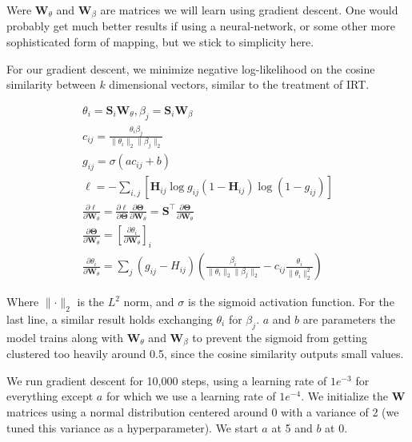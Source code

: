 \documentclass[twocolumn]{article}
\begin{document}
Were $\mathbf{W}_\theta$ and $\mathbf{W}_\beta$ are matrices we will learn
using gradient descent. One would probably get much better results if using a
neural-network, or some other more sophisticated form of mapping, but we stick
to simplicity here.

For our gradient descent, we minimize negative log-likelihood on the cosine
similarity between $k$ dimensional vectors, similar to the treatment of IRT.

\begin{gather}
    \theta_i = \mathbf{S}_i \mathbf{W}_\theta,
    \beta_j = \mathbf{S}_i \mathbf{W}_\beta \\
    c_{ij} = \frac{\theta_i \beta_j}
        {\lVert\theta_i\rVert_2 \lVert\beta_j\rVert_2} \\
    g_{ij} = \sigma(ac_{ij} + b) \\
    \ell = - \sum_{i,j} \left[\mathbf{H}_{ij} \log g_{ij}
        (1 - \mathbf{H}_{ij}) \log (1 - g_{ij})\right] \\
    \frac{\partial\ell}{\partial\mathbf{W}_\theta} = 
        \frac{\partial\ell}{\partial\mathbf{\Theta}}
        \frac{\partial\mathbf{\Theta}}{\partial\mathbf{W}_\theta} =
        \mathbf{S}^\top
        \frac{\partial\mathbf{\Theta}}{\partial\mathbf{W}_\theta} \\
    \frac{\partial\mathbf{\Theta}}{\partial\mathbf{W}_\theta} =
        \left[\frac{\partial\theta_i}{\partial\mathbf{W}_\theta}\right]_i \\
    \frac{\partial\theta_i}{\partial\mathbf{W}_\theta} =
    \sum_j \left(g_{ij} - H_{ij}\right)
        \left(\frac{\beta_i}{\lVert\theta_i\rVert_2 \lVert\beta_j\rVert_2}
         - c_{ij}\frac{\theta_i}{\lVert{\theta_i}\rVert_2^2}\right)
\end{gather}


Where $\lVert\cdot\rVert_2$ is the $L^2$ norm, and $\sigma$ is the sigmoid
activation function. For the last line, a similar result holds exchanging
$\theta_i$ for $\beta_j$. $a$ and $b$ are parameters the model trains along
with $\mathbf{W}_\theta$ and $\mathbf{W}_\beta$ to prevent the sigmoid from
getting clustered too heavily around 0.5, since the cosine similarity outputs
small values.

We run gradient descent for 10,000 steps, using a learning rate of $1e^{-3}$
for everything except $a$ for which we use a learning rate of $1e^{-4}$. We
initialize the $\mathbf{W}$ matrices using a normal distribution centered
around 0 with a variance of 2 (we tuned this variance as a hyperparameter). We
start $a$ at 5 and $b$ at 0.
\end{document}
